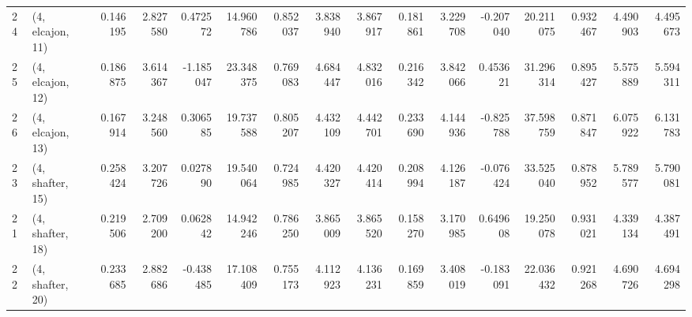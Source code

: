 \begin{tabular}{llrrrrrrrrrrrrrr}
24 &  (4, elcajon, 11) &   0.146195 &  2.827580 &  0.472572 &  14.960786 &  0.852037 &   3.838940 &  3.867917 &  0.181861 &   3.229708 & -0.207040 &   20.211075 &  0.932467 &   4.490903 &   4.495673 \\
25 &  (4, elcajon, 12) &   0.186875 &  3.614367 & -1.185047 &  23.348375 &  0.769083 &   4.684447 &  4.832016 &  0.216342 &   3.842066 &  0.453621 &   31.296314 &  0.895427 &   5.575889 &   5.594311 \\
26 &  (4, elcajon, 13) &   0.167914 &  3.248560 &  0.306585 &  19.737588 &  0.805207 &   4.432109 &  4.442701 &  0.233690 &   4.144936 & -0.825788 &   37.598759 &  0.871847 &   6.075922 &   6.131783 \\
23 &  (4, shafter, 15) &   0.258424 &  3.207726 &  0.027890 &  19.540064 &  0.724985 &   4.420327 &  4.420414 &  0.208994 &   4.126187 & -0.076424 &   33.525040 &  0.878952 &   5.789577 &   5.790081 \\
21 &  (4, shafter, 18) &   0.219506 &  2.709200 &  0.062842 &  14.942246 &  0.786250 &   3.865009 &  3.865520 &  0.158270 &   3.170985 &  0.649608 &   19.250078 &  0.931021 &   4.339134 &   4.387491 \\
22 &  (4, shafter, 20) &   0.233685 &  2.882686 & -0.438485 &  17.108409 &  0.755173 &   4.112923 &  4.136231 &  0.169859 &   3.408019 & -0.183091 &   22.036432 &  0.921268 &   4.690726 &   4.694298 \\
\bottomrule
\end{tabular}
